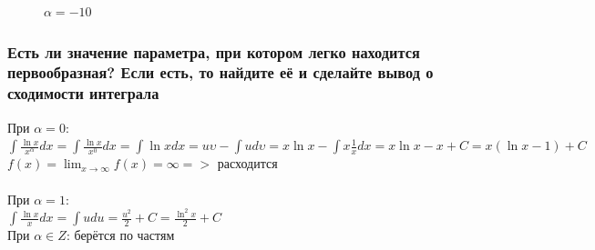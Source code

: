 \documentclass{article}
\begin{document}
\begin{figure}[h!]
\caption*{$ \alpha = -10 $}
\end{figure}
\subsubsection{Есть ли значение параметра, при котором легко находится первообразная? Если есть, то найдите её и сделайте вывод о сходимости интеграла}
При $ \alpha = 0 $:\\
\large
$ \int\limits \frac{\ln{x}}{x^{\alpha}}dx = \int\limits \frac{\ln{x}}{x^0}dx = \int\limits \ln{x}dx = u\upsilon - \int\limits ud\upsilon = x\ln{x} - \int\limits x\frac{1}{x}dx = x\ln{x} - x + C = x(\ln{x} - 1) + C $\\
$ f(x) = \lim_{x\to \infty} f(x) = \infty => $ расходится\\\\
\normalsize
При $ \alpha = 1 $:\\
\large
$ \int\limits \frac{\ln{x}}{x}dx = \int\limits udu = \frac{u^2}{2} + C = \frac{\ln^2{x}}{2} + C $\\
\normalsize
При $ \alpha \in Z $: берётся по частям
\end{document}

